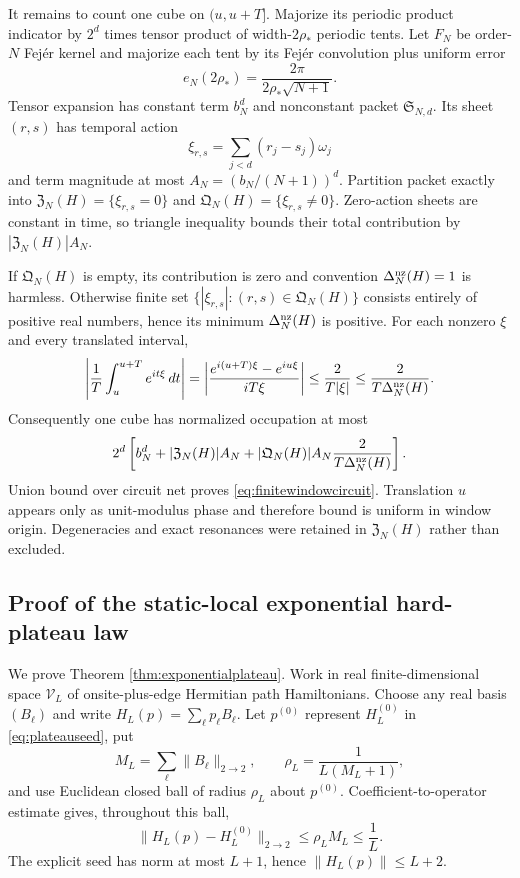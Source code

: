 It remains to count one cube on $(u,u+T]$.  Majorize its periodic product
indicator by $2^d$ times tensor product of width-$2\rho_*$ periodic tents.
Let $F_N$ be order-$N$ Fej\'er kernel and majorize each tent by its Fej\'er
convolution plus uniform error
\[
 e_N(2\rho_*)=\frac{2\pi}{2\rho_*\sqrt{N+1}}.
\]
Tensor expansion has constant term $b_N^d$ and nonconstant packet
$\mathfrak S_{N,d}$.  Its sheet $(r,s)$ has temporal action
\[
 \xi_{r,s}=\sum_{j<d}(r_j-s_j)\omega_j
\]
and term magnitude at most
$A_N=(b_N/(N+1))^d$.  Partition packet exactly into
$\mathfrak Z_N(H)=\{\xi_{r,s}=0\}$ and
$\mathfrak Q_N(H)=\{\xi_{r,s}\ne0\}$.  Zero-action sheets are constant in time,
so triangle inequality bounds their total contribution by
$|\mathfrak Z_N(H)|A_N$.

If $\mathfrak Q_N(H)$ is empty, its contribution is zero and convention
$\Delta_N^{\rm nz}(H)=1$ is harmless.  Otherwise finite set
$\{|\xi_{r,s}|:(r,s)\in\mathfrak Q_N(H)\}$ consists entirely of positive real
numbers, hence its minimum $\Delta_N^{\rm nz}(H)$ is positive.  For each
nonzero $\xi$ and every translated interval,
\[
 \left|\frac1T\int_u^{u+T}e^{it\xi}\,dt\right|
 =\left|\frac{e^{i(u+T)\xi}-e^{iu\xi}}{iT\xi}\right|
 \le\frac{2}{T|\xi|}
 \le\frac{2}{T\Delta_N^{\rm nz}(H)}.
\]
Consequently one cube has normalized occupation at most
\[
 2^d\left[
 b_N^d+|\mathfrak Z_N(H)|A_N+
 |\mathfrak Q_N(H)|A_N\frac{2}{T\Delta_N^{\rm nz}(H)}
 \right].
\]
Union bound over circuit net proves \eqref{eq:finitewindowcircuit}.  Translation
$u$ appears only as unit-modulus phase and therefore bound is uniform in
window origin.  Degeneracies and exact resonances were retained in
$\mathfrak Z_N(H)$ rather than excluded.

\subsection{Proof of the static-local exponential hard-plateau law}

We prove Theorem \ref{thm:exponentialplateau}.  Work in real finite-dimensional
space $\mathscr V_L$ of onsite-plus-edge Hermitian path Hamiltonians.  Choose
any real basis $(B_\ell)$ and write
$H_L(p)=\sum_\ell p_\ell B_\ell$.  Let $p^{(0)}$ represent
$H_L^{(0)}$ in \eqref{eq:plateauseed}, put
\begin{equation}
 M_L=\sum_\ell\|B_\ell\|_{2\to2},\qquad
 \rho_L=\frac1{L(M_L+1)},                            \label{eq:plateauball}
\end{equation}
and use Euclidean closed ball of radius $\rho_L$ about $p^{(0)}$.
Coefficient-to-operator estimate gives, throughout this ball,
\begin{equation}
 \|H_L(p)-H_L^{(0)}\|_{2\to2}
 \le\rho_LM_L\le\frac1L.                           \label{eq:plateauballop}
\end{equation}
The explicit seed has norm at most $L+1$, hence
$\|H_L(p)\|\le L+2$.

